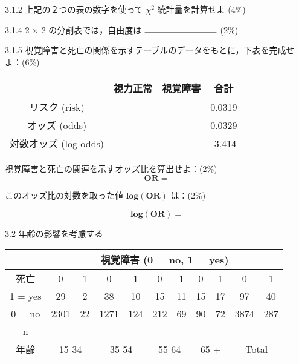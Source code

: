 \documentclass[11pt,]{problemset}
\begin{document}
3.1.2 上記の２つの表の数字を使って \(\chi^2\) 統計量を計算せよ (4\%)

\bigskip\bigskip\bigskip\bigskip\bigskip
\bigskip\bigskip\bigskip\bigskip\bigskip
\bigskip\bigskip\bigskip\bigskip\bigskip
\bigskip\bigskip\bigskip\bigskip\bigskip
\bigskip\bigskip\bigskip\bigskip\bigskip

3.1.4 2 \(\times\) 2 の分割表では，自由度は \(\rule{3cm}{0.2mm}\) (2\%)

\newpage

3.1.5
視覚障害と死亡の関係を示すテーブルのデータをもとに，下表を完成せよ：(6\%)

\bigskip\bigskip

\begin{center}
\begin{tabular}{|c|c|c|c|}
\hline
                 & 視力正常   & 視覚障害    & 合計   \\ \hline
リスク (risk)       &  &   & 0.0319 \\ \hline
オッズ (odds)       &  &   & 0.0329 \\ \hline
対数オッズ (log-odds) &  &  & -3.414 \\ \hline
\end{tabular}
\end{center}

\bigskip

視覚障害と死亡の関連を示すオッズ比を算出せよ：(2\%) \[
\mathbf{OR} = 
\]

このオッズ比の対数を取った値 \(\mathbf{log(OR)}\) は：(2\%)

\[
\mathbf{log(OR)} = 
\]

3.2 年齢の影響を考慮する

\begin{center}
\begin{tabular}{|c|c|c|c|c|c|c|c|c|c|c|}
\hline
       & \multicolumn{10}{c|}{視覚障害 (0 = no, 1 = yes)}                                                                                                  \\ \hline
死亡     & 0             & 1          & 0            & 1           & 0            & 1           & 0           & 1           & 0            & 1           \\ \hline
1 = yes & 29            & 2          & 38           & 10          & 15           & 11          & 15          & 17          & 97           & 40          \\ \hline
0 = no & 2301          & 22         & 1271         & 124         & 212          & 69          & 90          & 72          & 3874         & 287         \\ \hline
  n     &           &           &          &          &           &           &           &           &          &          \\ \hline
年齢     & \multicolumn{2}{c|}{15-34} & \multicolumn{2}{c|}{35-54} & \multicolumn{2}{c|}{55-64} & \multicolumn{2}{c|}{65 +} & \multicolumn{2}{c|}{Total} \\ \hline
\end{tabular}
\end{center}
\end{document}
